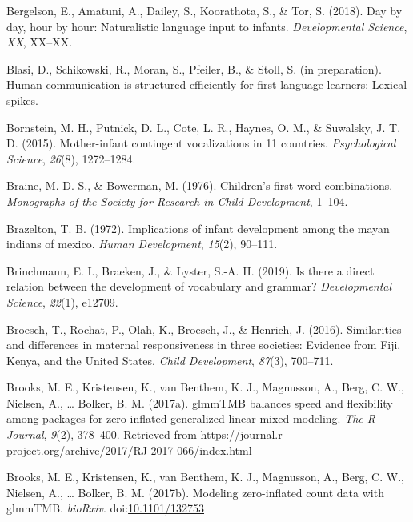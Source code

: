 \documentclass[floatsintext,man]{apa6}
\theoremstyle{definition}
\theoremstyle{definition}
\theoremstyle{definition}
\theoremstyle{remark}
\begin{document}
\hypertarget{ref-bergelson2018day}{}
Bergelson, E., Amatuni, A., Dailey, S., Koorathota, S., \& Tor, S.
(2018). Day by day, hour by hour: Naturalistic language input to
infants. \emph{Developmental Science}, \emph{XX}, XX--XX.

\hypertarget{ref-blasiIPhuman}{}
Blasi, D., Schikowski, R., Moran, S., Pfeiler, B., \& Stoll, S. (in
preparation). Human communication is structured efficiently for first
language learners: Lexical spikes.

\hypertarget{ref-bornstein2015mother}{}
Bornstein, M. H., Putnick, D. L., Cote, L. R., Haynes, O. M., \&
Suwalsky, J. T. D. (2015). Mother-infant contingent vocalizations in 11
countries. \emph{Psychological Science}, \emph{26}(8), 1272--1284.

\hypertarget{ref-braine1976childrens}{}
Braine, M. D. S., \& Bowerman, M. (1976). Children's first word
combinations. \emph{Monographs of the Society for Research in Child
Development}, 1--104.

\hypertarget{ref-brazelton1972implications}{}
Brazelton, T. B. (1972). Implications of infant development among the
mayan indians of mexico. \emph{Human Development}, \emph{15}(2),
90--111.

\hypertarget{ref-brinchmann2019direct}{}
Brinchmann, E. I., Braeken, J., \& Lyster, S.-A. H. (2019). Is there a
direct relation between the development of vocabulary and grammar?
\emph{Developmental Science}, \emph{22}(1), e12709.

\hypertarget{ref-broesch2016similarities}{}
Broesch, T., Rochat, P., Olah, K., Broesch, J., \& Henrich, J. (2016).
Similarities and differences in maternal responsiveness in three
societies: Evidence from Fiji, Kenya, and the United States. \emph{Child
Development}, \emph{87}(3), 700--711.

\hypertarget{ref-R-glmmTMB}{}
Brooks, M. E., Kristensen, K., van Benthem, K. J., Magnusson, A., Berg,
C. W., Nielsen, A., \ldots{} Bolker, B. M. (2017a). glmmTMB balances
speed and flexibility among packages for zero-inflated generalized
linear mixed modeling. \emph{The R Journal}, \emph{9}(2), 378--400.
Retrieved from
\url{https://journal.r-project.org/archive/2017/RJ-2017-066/index.html}

\hypertarget{ref-brooks2017modeling}{}
Brooks, M. E., Kristensen, K., van Benthem, K. J., Magnusson, A., Berg,
C. W., Nielsen, A., \ldots{} Bolker, B. M. (2017b). Modeling
zero-inflated count data with glmmTMB. \emph{bioRxiv}.
doi:\href{https://doi.org/10.1101/132753}{10.1101/132753}
\end{document}

